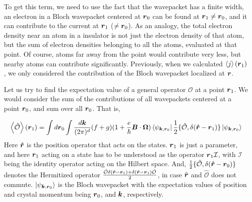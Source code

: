 \documentclass{report}
\renewcommand\vec[1]{\ensuremath\boldsymbol{#1}} %
\begin{document}
To get this term, we need to use the fact that the wavepacket has a finite width, an electron in a Bloch wavepacket centered at $\vec{r}_0$ can be found at $\vec{r}_1 \neq \vec{r}_0$, and it can contribute to the current at $\vec{r}_1$ ($\neq \vec{r}_0$). As an analogy, the total electron density near an atom in a insulator is not just the electron density of that atom, but the sum of electron densities belonging to all the atoms, evaluated at that point. Of course, atoms far away from the point would contribute very less, but nearby atoms can contribute significantly. Previously, when we calculated $\expval{j}(\vec{r}_1)$, we only considered the contribution of the  Bloch wavepacket localized at $\vec{r}$.

Let us try to find the expectation value of a general operator $\mathcal{O}$ at a point $\vec{r}_1$. We would consider the sum of the contributions of all wavepackets centered at a point $\vec{r}_0$, and sum over all $\vec{r}_0$. That is, \cite{XiaoElecPropertiesReview2010}

$$
	\expval{\hat{\mathcal{O}}}(\vec{r}_1) = \int d\vec{r}_0 \int  \frac{d\vec{k}}{(2\pi)^d} (f+g) (1+\frac{e}{\hbar} \vec{B}\cdot\vec{\Omega})
	\bra{\psi_{\vec{k},\vec{r}_0}} \frac{1}{2}\{\hat{\mathcal{O}}, \delta(\vec{\hat{r}} - \vec{r}_1)\} \ket{\psi_{\vec{k},\vec{r}_0}} 
$$
Here $\vec{\hat{r}}$ is the position operator that acts on the states. $\vec{r}_1$ is just a parameter, and here $\vec{r}_1$ acting on a state has to be understood as the operator $\vec{r}_1 \mathcal{I}$, with $\mathcal{I}$ being the identity operator acting on the Hilbert space. And,
$\frac{1}{2}\{\hat{\mathcal{O}}, \delta(\vec{\hat{r}} - \vec{r}_0)\}$ denotes the Hermitized operator $\frac{\hat{\mathcal{O}}  \delta(\vec{\hat{r}} - \vec{r}_1) + \delta(\vec{\hat{r}} - \vec{r}_1)\hat{\mathcal{O}}  }{2}$, in case $\hat{\vec{r}}$ and $\hat{\mathcal{O}}$ does not commute. $\ket{\psi_{\vec{k},\vec{r}_0}}$ is the Bloch wavepacket with the expectation values of position and crystal momentum being $\vec{r}_0$, and $\vec{k}$, respectively.
\end{document}
